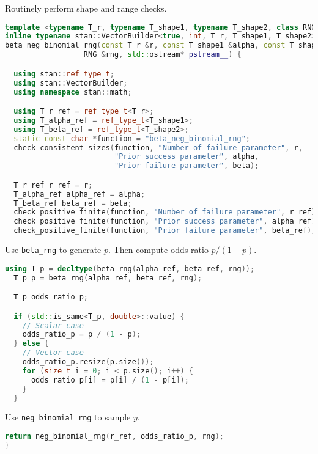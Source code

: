\documentclass[11pt]{article}
\begin{document}
Routinely perform shape and range checks.
\begin{lstlisting}[language=c++, style=lgeneral]
template <typename T_r, typename T_shape1, typename T_shape2, class RNG>
inline typename stan::VectorBuilder<true, int, T_r, T_shape1, T_shape2>::type
beta_neg_binomial_rng(const T_r &r, const T_shape1 &alpha, const T_shape2 &beta,
                  RNG &rng, std::ostream* pstream__) {

  using stan::ref_type_t;
  using stan::VectorBuilder;
  using namespace stan::math;

  using T_r_ref = ref_type_t<T_r>;
  using T_alpha_ref = ref_type_t<T_shape1>;
  using T_beta_ref = ref_type_t<T_shape2>;
  static const char *function = "beta_neg_binomial_rng";
  check_consistent_sizes(function, "Number of failure parameter", r,
                         "Prior success parameter", alpha,
                         "Prior failure parameter", beta);

  T_r_ref r_ref = r;
  T_alpha_ref alpha_ref = alpha;
  T_beta_ref beta_ref = beta;
  check_positive_finite(function, "Number of failure parameter", r_ref);
  check_positive_finite(function, "Prior success parameter", alpha_ref);
  check_positive_finite(function, "Prior failure parameter", beta_ref);

\end{lstlisting}


Use \verb|beta_rng| to generate $p$. Then compute odds ratio $p/(1-p)$.
\begin{lstlisting}[language=c++, style=lgeneral]
  using T_p = decltype(beta_rng(alpha_ref, beta_ref, rng));
  T_p p = beta_rng(alpha_ref, beta_ref, rng);

  T_p odds_ratio_p;

  if (std::is_same<T_p, double>::value) {
    // Scalar case
    odds_ratio_p = p / (1 - p);
  } else {
    // Vector case
    odds_ratio_p.resize(p.size());
    for (size_t i = 0; i < p.size(); i++) {
      odds_ratio_p[i] = p[i] / (1 - p[i]);
    }
  }	
\end{lstlisting}

Use \verb|neg_binomial_rng| to sample $y$.
\begin{lstlisting}[language=c++, style=lgeneral]
	return neg_binomial_rng(r_ref, odds_ratio_p, rng);
}	
\end{lstlisting}
\end{document}
